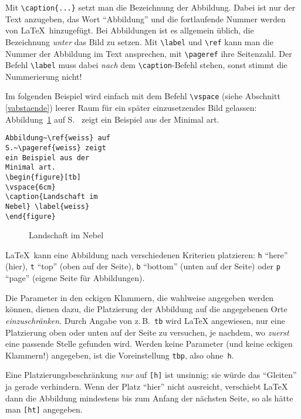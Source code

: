 Mit \verb|\caption{...}| setzt man die Bezeichnung der Abbildung.
Dabei ist nur der Text anzugeben, das Wort "`Abbildung"' und die
fortlaufende Nummer werden von \LaTeX\ hinzugefügt.
Bei Abbildungen ist es allgemein üblich, die Bezeichnung
\emph{unter} das Bild zu setzen.
Mit \verb|\label| und \verb|\ref| kann man die Nummer der
Abbildung im Text ansprechen, mit \verb|\pageref| ihre Seitenzahl.
Der Befehl \verb:\label: muss dabei \emph{nach} dem \verb:\caption:-Befehl
stehen, sonst stimmt die Nummerierung nicht!

Im folgenden Beispiel wird einfach mit dem Befehl \verb|\vspace|
(siehe Abschnitt \ref{vabstaende})
leerer Raum für ein später einzusetzendes Bild gelassen:
\exa
Abbildung~\ref{weiss} auf S.~\pageref{weiss} zeigt ein
Beispiel aus der Minimal art.
\exb
\begin{verbatim}
Abbildung~\ref{weiss} auf
S.~\pageref{weiss} zeigt
ein Beispiel aus der 
Minimal art.
\begin{figure}[tb]
\vspace{6cm}
\caption{Landschaft im
Nebel} \label{weiss}
\end{figure}
\end{verbatim}
\exc
\begin{figure}[tb]
\vspace{6cm}
\caption{Landschaft im
Nebel} \label{weiss}
\end{figure}

\LaTeX\ kann eine Abbildung nach verschiedenen Kriterien platzieren:
\texttt{h} "`here"' (hier),
\texttt{t} "`top"' (oben auf der Seite), \texttt{b} "`bottom"' (unten
auf der Seite) oder \texttt{p} "`page"' (eigene Seite für
Abbildungen).

Die Parameter in den eckigen Klammern, die wahlweise angegeben
werden können, dienen dazu, die Platzierung der Abbildung auf die
angegebenen Orte \emph{einzuschränken}.  Durch Angabe von
z.\,B.\ \texttt{tb}
wird \LaTeX{} angewiesen, nur eine Platzierung oben oder unten auf der
Seite zu versuchen, je nachdem,
wo \emph{zuerst} eine passende Stelle gefunden wird.
Werden keine Parameter (und keine eckigen
Klammern!) angegeben, ist die Voreinstellung \texttt{tbp},
also ohne~\texttt{h}.

Eine Platzierungsbeschränkung \emph{nur} auf \texttt{[h]} ist unsinnig;
sie würde das "`Gleiten"' ja gerade verhindern.
Wenn der Platz "`hier"' nicht ausreicht, 
verschiebt \LaTeX{} dann die Abbildung mindestens 
bis zum Anfang der nächsten Seite, so als hätte man \texttt{[ht]} angegeben.

